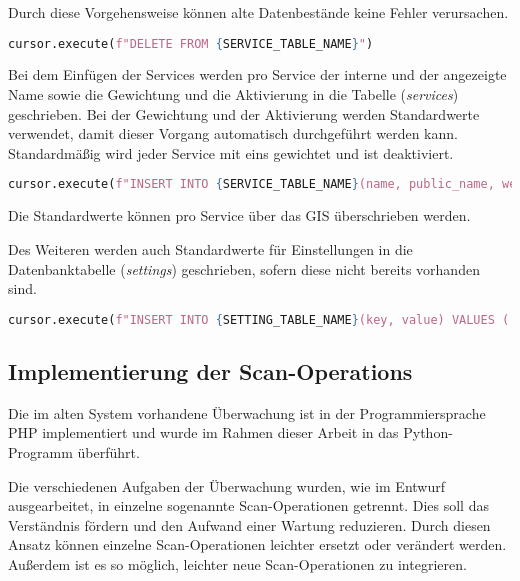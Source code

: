 Durch diese Vorgehensweise können alte Datenbestände keine Fehler verursachen.

\begin{lstlisting}[language=Python, frame=single, caption={Löschen der Services}, captionpos=b, label={lst:bigbrother-delete-service}]
cursor.execute(f"DELETE FROM {SERVICE_TABLE_NAME}")	
\end{lstlisting}

Bei dem Einfügen der Services werden pro Service der interne und der angezeigte Name sowie die Gewichtung und die Aktivierung in die Tabelle (\textit{services}) geschrieben. Bei der Gewichtung und der Aktivierung werden Standardwerte verwendet, damit dieser Vorgang automatisch durchgeführt werden kann. Standardmäßig wird jeder Service mit eins gewichtet und ist deaktiviert.

\begin{lstlisting}[language=Python, frame=single, caption={Einfügen eines Services}, captionpos=b, label={lst:bigbrother-create-service}]
cursor.execute(f"INSERT INTO {SERVICE_TABLE_NAME}(name, public_name, weight, active) VALUES ('{name}', '{public_name}', 1, FALSE);")
\end{lstlisting}

Die Standardwerte können pro Service über das GIS überschrieben werden.

Des Weiteren werden auch Standardwerte für Einstellungen in die Datenbanktabelle (\textit{settings}) geschrieben, sofern diese nicht bereits vorhanden sind.

\begin{lstlisting}[language=Python, frame=single, caption={Einfügen einer Einstellung}, captionpos=b, label={lst:bigbrother-create-settings}]
cursor.execute(f"INSERT INTO {SETTING_TABLE_NAME}(key, value) VALUES ('{default_value[0]}', '{default_value[1]}') ON CONFLICT (key) DO NOTHING;")
\end{lstlisting}


\subsection{Implementierung der Scan-Operations}
Die im alten System vorhandene Überwachung ist in der Programmiersprache PHP implementiert und wurde im Rahmen dieser Arbeit in das Python-Programm überführt.

Die verschiedenen Aufgaben der Überwachung wurden, wie im Entwurf ausgearbeitet, in einzelne sogenannte Scan-Operationen getrennt. Dies soll das Verständnis fördern und den Aufwand einer Wartung reduzieren. Durch diesen Ansatz können einzelne Scan-Operationen leichter ersetzt oder verändert werden. Außerdem ist es so möglich, leichter neue Scan-Operationen zu integrieren.

